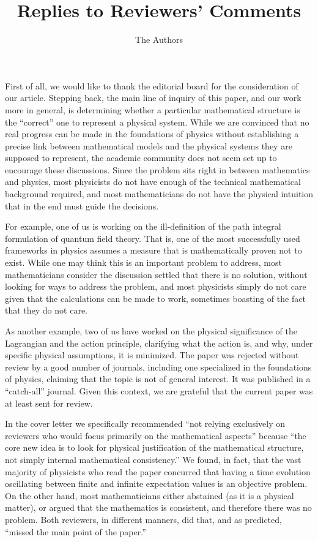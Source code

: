 \documentclass[11pt, executivepaper]{article}
\begin{document}
\title{\textbf{Replies to Reviewers' Comments}}

\author{The Authors}

\maketitle


\noindent First of all, we would like to thank the editorial board for the consideration of our article. Stepping back, the main line of inquiry of this paper, and our work more in general, is determining whether a particular mathematical structure is the ``correct'' one to represent a physical system. While we are convinced that no real progress can be made in the foundations of physics without establishing a precise link between mathematical models and the physical systems they are supposed to represent, the academic community does not seem set up to encourage these discussions. Since the problem sits right in between mathematics and physics, most physicists do not have enough of the technical mathematical background required, and most mathematicians do not have the physical intuition that in the end must guide the decisions.

For example, one of us is working on the ill-definition of the path integral formulation of quantum field theory. That is, one of the most successfully used frameworks in physics assumes a measure that is mathematically proven not to exist. While one may think this is an important problem to address, most mathematicians consider the discussion settled that there is no solution, without looking for ways to address the problem, and most physicists simply do not care given that the calculations can be made to work, sometimes boasting of the fact that they do not care.

As another example, two of us have worked on the physical significance of the Lagrangian and the action principle, clarifying what the action is, and why, under specific physical assumptions, it is minimized. The paper was rejected without review by a good number of journals, including one specialized in the foundations of physics, claiming that the topic is not of general interest. It was published in a ``catch-all'' journal. Given this context, we are grateful that the current paper was at least sent for review. 

In the cover letter we specifically recommended ``not relying exclusively on reviewers who would focus primarily on the mathematical aspects'' because ``the core new idea is to look for physical justification of the mathematical structure, not simply internal mathematical consistency.'' We found, in fact, that the vast majority of physicists who read the paper concurred that having a time evolution oscillating between finite and infinite expectation values is an objective problem. On the other hand, most mathematicians either abstained (as it is a physical matter), or argued that the mathematics is consistent, and therefore there was no problem. Both reviewers, in different manners, did that, and as predicted, ``missed the main point of the paper.''
\end{document}

